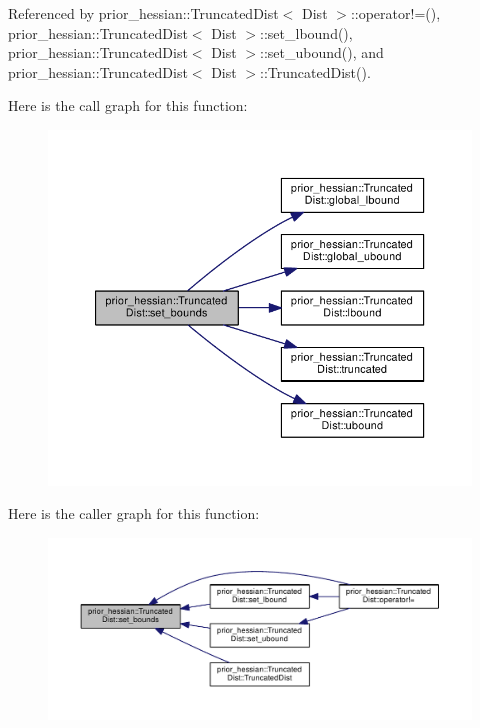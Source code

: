 Referenced by prior\+\_\+hessian\+::\+Truncated\+Dist$<$ Dist $>$\+::operator!=(), prior\+\_\+hessian\+::\+Truncated\+Dist$<$ Dist $>$\+::set\+\_\+lbound(), prior\+\_\+hessian\+::\+Truncated\+Dist$<$ Dist $>$\+::set\+\_\+ubound(), and prior\+\_\+hessian\+::\+Truncated\+Dist$<$ Dist $>$\+::\+Truncated\+Dist().



Here is the call graph for this function\+:\nopagebreak
\begin{figure}[H]
\begin{center}
\leavevmode
\includegraphics[width=350pt]{classprior__hessian_1_1TruncatedDist_a9189a3e17c4bf37c22aebe327b79dd63_cgraph}
\end{center}
\end{figure}




Here is the caller graph for this function\+:\nopagebreak
\begin{figure}[H]
\begin{center}
\leavevmode
\includegraphics[width=350pt]{classprior__hessian_1_1TruncatedDist_a9189a3e17c4bf37c22aebe327b79dd63_icgraph}
\end{center}
\end{figure}


